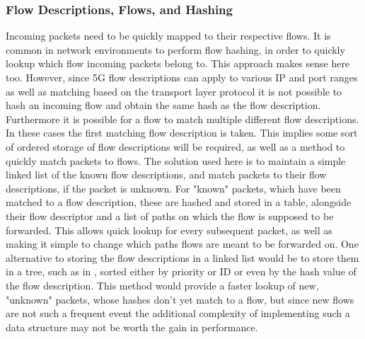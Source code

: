 \subsubsection{Flow Descriptions, Flows, and Hashing}

Incoming packets need to be quickly mapped to their respective flows. It is common in network environments to perform flow hashing, in order to quickly lookup which flow incoming packets belong to. This approach makes sense here too. However, since 5G flow descriptions can apply to various IP and port ranges as well as matching based on the transport layer protocol it is not possible to hash an incoming flow and obtain the same hash as the flow description. Furthermore it is possible for a flow to match multiple different flow descriptions. In these cases the first matching flow description is taken. This implies some sort of ordered storage of flow descriptions will be required, as well as a method to quickly match packets to flows. The solution used here is to maintain a simple linked list of the known flow descriptions, and match packets to their flow descriptions, if the packet is unknown. For "known" packets, which have been matched to a flow description, these are hashed and stored in a table, alongside their flow descriptor and a list of paths on which the flow is supposed to be forwarded. This allows quick lookup for every subsequent packet, as well as making it simple to change which paths flows are meant to be forwarded on. One alternative to storing the flow descriptions in a linked list would be to store them in a tree, such as in \cite{tongaonkar2004fast}, sorted either by priority or ID or even by the hash value of the flow description. This method would provide a faster lookup of new, "unknown" packets, whose hashes don't yet match to a flow, but since new flows are not such a frequent event the additional complexity of implementing such a data structure may not be worth the gain in performance.

